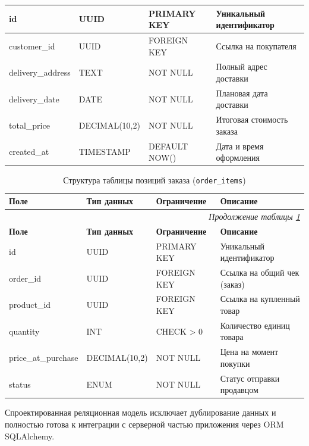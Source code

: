 {\begin{longtable}{|p{3.2cm}|p{3cm}|p{3.5cm}|p{5.3cm}|}
	\hline
	\endfoot

	\hline
	\endlastfoot

	id & UUID & PRIMARY KEY & Уникальный идентификатор \\ \hline
	customer\_id & UUID & FOREIGN KEY & Ссылка на покупателя \\ \hline
	delivery\_address & TEXT & NOT NULL & Полный адрес доставки \\ \hline
	delivery\_date & DATE & NOT NULL & Плановая дата доставки \\ \hline
	total\_price & DECIMAL(10,2) & NOT NULL & Итоговая стоимость заказа \\ \hline
	created\_at & TIMESTAMP & DEFAULT NOW() & Дата и время оформления \\ \hline
\end{longtable}

\begin{longtable}{|p{3.2cm}|p{3cm}|p{3.5cm}|p{5.3cm}|}
	\caption{Структура таблицы позиций заказа (\texttt{order\_items})} \label{tab:db_order_items} \\
	\hline
	\textbf{Поле} & \textbf{Тип данных} & \textbf{Ограничение} & \textbf{Описание} \\ \hline
	\endfirsthead

	\multicolumn{4}{r}{\textit{Продолжение таблицы \ref{tab:db_order_items}}} \\
	\hline
	\textbf{Поле} & \textbf{Тип данных} & \textbf{Ограничение} & \textbf{Описание} \\ \hline
	\endhead

	\hline
	\endfoot

	\hline
	\endlastfoot

	id & UUID & PRIMARY KEY & Уникальный идентификатор \\ \hline
	order\_id & UUID & FOREIGN KEY & Ссылка на общий чек (заказ) \\ \hline
	product\_id & UUID & FOREIGN KEY & Ссылка на купленный товар \\ \hline
	quantity & INT & CHECK > 0 & Количество единиц товара \\ \hline
	price\_at\_purchase & DECIMAL(10,2) & NOT NULL & Цена на момент покупки \\ \hline
	status & ENUM & NOT NULL & Статус отправки продавцом \\ \hline
\end{longtable}
}

Спроектированная реляционная модель исключает дублирование данных и полностью готова к интеграции с серверной частью приложения через ORM SQLAlchemy.


